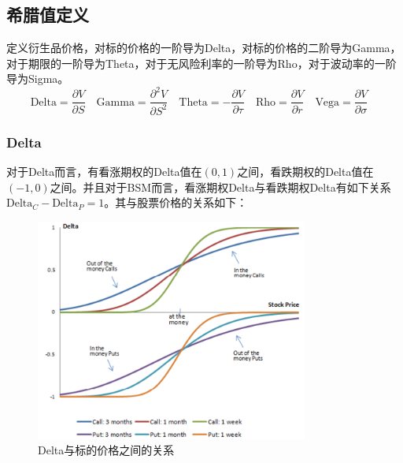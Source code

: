 \documentclass[11pt]{article}
\begin{document}
\subsection{希腊值定义}

定义衍生品价格，对标的价格的一阶导为Delta，对标的价格的二阶导为Gamma，对于期限的一阶导为Theta，对于无风险利率的一阶导为Rho，对于波动率的一阶导为Sigma。
\begin{equation*}
    \text{Delta} = \frac{\partial V}{\partial S} \quad 
    \text{Gamma}  = \frac{\partial^2 V}{\partial S^2} \quad
    \text{Theta} = -\frac{\partial V}{\partial \tau} \quad
    \text{Rho} = \frac{\partial V}{\partial r} \quad
    \text{Vega} = \frac{\partial V}{\partial\sigma} \quad
\end{equation*}

\subsubsection{Delta}

对于Delta而言，有看涨期权的Delta值在$(0,1)$之间，看跌期权的Delta值在$(-1,0)$之间。并且对于BSM而言，看涨期权Delta与看跌期权Delta有如下关系$\text{Delta}_C - \text{Delta}_P = 1$。其与股票价格的关系如下：
\begin{figure}[H]
    \centering
    \includegraphics[width=0.8\textwidth]{fig/delta-stockprice.png}
    \caption{Delta与标的价格之间的关系}
    \label{fig:delta-stockprice}
\end{figure}
\end{document}
